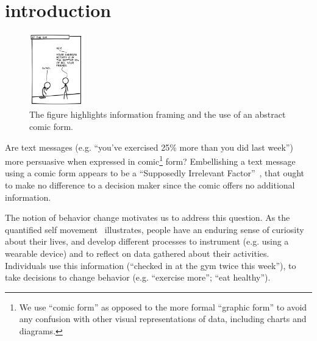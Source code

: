 



\section{introduction}
\label{sec:introduction}

\begin{figure}
    \centering
    \includegraphics[width=0.21\textwidth]{figures/intro_new.png}
  \vspace{-10pt}
  \caption{The figure highlights information framing and the use of an abstract comic form.} \label{fig:intro}
  \vspace{-10pt}
\end{figure}

Are text messages (e.g. ``you've exercised 25\% more than you did last week'') more persuasive when expressed in comic\footnote{We use ``comic form'' as opposed to the more formal ``graphic form'' to avoid any confusion with other visual representations of data, including charts and diagrams.} form? Embellishing a text message using a comic form appears to be a ``Supposedly Irrelevant Factor''~\cite{Thaler2015}, that ought to make no difference to a decision maker since the comic offers no additional information.

The notion of behavior change motivates us to address this question. As the quantified self movement~\cite{Epstein2014,Choe2014} illustrates, people have an enduring sense of curiosity about their lives, and develop different processes to instrument (e.g. using a wearable device) and to reflect on data gathered about their activities. Individuals use this information (``checked in at the gym twice this week''), to take decisions to change behavior (e.g. ``exercise more''; ``eat healthy'').

